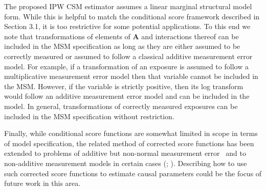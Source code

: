 \documentclass[12pt]{article}
\begin{document}
The proposed IPW CSM estimator assumes a linear marginal structural model form. While this is helpful to match the conditional score framework described in Section 3.1, it is too restrictive for some potential applications. To this end we note that transformations of elements of $\bm{A}$ and interactions thereof can be included in the MSM specification as long as they are either assumed to be correctly measured or assumed to follow a classical additive measurement error model. For example, if a transformation of an exposure is assumed to follow a multiplicative measurement error model then that variable cannot be included in the MSM. However, if the variable is strictly positive, then its log transform would follow an additive measurement error model and can be included in the model. In general, transformations of correctly measured exposures can be included in the MSM specification without restriction.

Finally, while conditional score functions are somewhat limited in scope in terms of model specification, the related method of corrected score functions has been extended to problems of additive but non-normal measurement error~\citep{buzas1996} and to non-additive measurement models in certain cases (\citealp{nakamura1990}; \citealp*{li2004}). Describing how to use such corrected score functions to estimate causal parameters could be the focus of future work in this area.



\end{document}
